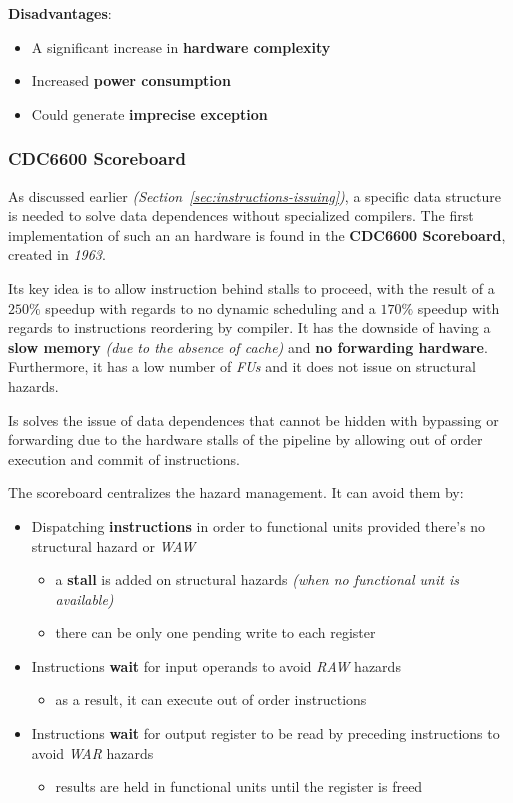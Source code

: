 \documentclass[english]{article}
\begin{document}
\textbf{Disadvantages}:
\begin{itemize}
  \item A significant increase in \textbf{hardware complexity}
  \item Increased \textbf{power consumption}
  \item Could generate \textbf{imprecise exception}
\end{itemize}

\subsubsection{CDC6600 Scoreboard}
\label{par:CDC6600-scoreboard}

As discussed earlier \textit{(Section~\ref{sec:instructions-issuing})}, a specific data structure is needed to solve data  dependences without specialized compilers.
The first implementation of such an an hardware is found in the \textbf{CDC6600 Scoreboard}, created in \textit{1963}.

Its key idea is to allow instruction behind stalls to proceed, with the result of a \(250\%\) speedup with regards to no dynamic scheduling and a \(170\%\) speedup with regards to instructions reordering by compiler.
It has the downside of having a \textbf{slow memory} \textit{(due to the absence of cache)} and \textbf{no forwarding hardware}.
Furthermore, it has a low number of \textit{FUs} and it does not issue on structural hazards.

Is solves the issue of data  dependences that cannot be hidden with bypassing or forwarding due to the hardware stalls of the pipeline by allowing out of order execution and commit of instructions.

\bigskip
The scoreboard centralizes the hazard management.
It can avoid them by:

\begin{itemize}
  \item Dispatching \textbf{instructions} in order to functional units provided there's no structural hazard or \textit{WAW}
        \begin{itemize}
          \item a \textbf{stall} is added on structural hazards \textit{(when no functional unit is available)}
          \item there can be only one pending write to each register
        \end{itemize}
  \item Instructions \textbf{wait} for input operands to avoid \textit{RAW} hazards
        \begin{itemize}
          \item as a result, it can execute out of order instructions
        \end{itemize}
  \item Instructions \textbf{wait} for output register to be read by preceding instructions to avoid \textit{WAR} hazards
        \begin{itemize}
          \item results are held in functional units until the register is freed
        \end{itemize}
\end{itemize}
\end{document}
